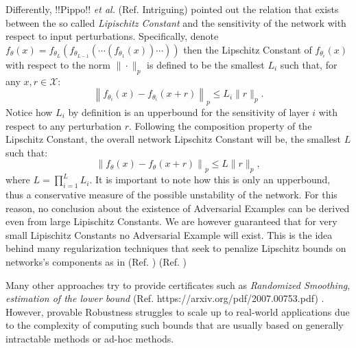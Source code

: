 \documentclass[LaM,binding=0.6cm]{./packages/sapthesis/sapthesis}
\begin{document}
            Differently, !!Pippo!! \textit{et al.} (Ref. Intriguing) pointed out the relation that exists 
            between the so called \textit{Lipischitz Constant} and the sensitivity of the network 
            with respect to input perturbations. Specifically, denote $f_{\theta}(x) = f_{\theta_L}(f_{\theta_{L-1}}(\cdots (f_{\theta_{1}}(x))\cdots)) $
            then the Lipschitz Constant of  $f_{\theta_i}(x)$ with respect to the norm $ \|\cdot\|_p $ is defined to be
            the smallest $L_i$ such that, for any $x, r \in \mathcal{X}$:
            \begin{equation}
                \label{LC}
                \left\|f_{\theta_i}\left(x \right)-f_{\theta_i}\left(x+r\right)\right\|_p \leq L_{i}\|r\|_p .
            \end{equation}
            Notice how $L_i$ by definition is an upperbound for the sensitivity of layer $i$ with respect
            to any perturbation $r$. Following the composition property of the
            Lipschitz Constant, the overall network Lipschitz Constant will be, the smallest $L$ such that:
            \begin{equation}
                \left\|f_{\theta}\left(x \right)-f_{\theta}\left(x+r\right)\right\|_p \leq L\|r\|_p,
            \end{equation}
            where $L=\prod_{i=1}^{L} L_{i}$. It is important to note how this is only an upperbound, thus a conservative
            measure of the possible unstability of the network. For this reason, no conclusion about the existence of 
            Adversarial Examples can be derived even from large Lipischitz Constants. We are however guaranteed 
            that for very small Lipischitz Constants no Adversarial Example will exist. This is the idea behind 
            many regularization techniques that seek to penalize Lipschitz bounds on networks's components as 
            in (Ref. ) (Ref. )

            Many other approaches try to provide certificates such as \textit{Randomized Smoothing}, \textit{estimation of the lower bound} (Ref. https://arxiv.org/pdf/2007.00753.pdf)
            . However, provable Robustness struggles to scale up to real-world applications
            due to the complexity of computing such bounds that are usually based on generally intractable methods or ad-hoc methods.
\end{document}
